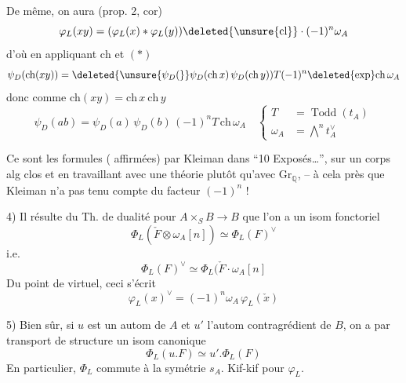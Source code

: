 De même, on aura (prop. 2, cor)
\[
\varphi_L(xy)=(\varphi_L(x)*\varphi_L(y))\deleted{\unsure{\mathrm{cl}}}\cdot(-1)^n\omega_A
\]
d'où en appliquant $\mathrm{ch}$ et $({*})$
\[
\psi_D(\mathrm{ch}(xy))=\deleted{\unsure{\psi_D(}}\psi_D(\mathrm{ch}\,x)\,\psi_D(\mathrm{ch}\,y))T(-1)^n\deleted{\exp}\mathrm{ch}\,\omega_A
\]
donc comme $\mathrm{ch}(xy)=\mathrm{ch}\,x\ \mathrm{ch}\,y$
\[
\boxed{\psi_D(ab)=\psi_D(a)\,\psi_D(b)\,(-1)^nT\,\mathrm{ch}\,\omega_A}
\quad\left\{\begin{aligned}
T&=\operatorname{Todd}(t_A)\\
\omega_A&=\bigwedge^n t_A^\vee
\end{aligned}\right.
\]

Ce sont les formules   ( affirmées) par Kleiman dans ``10 Exposés\ldots'', sur un corps alg clos et en travaillant avec une théorie  plutôt qu'avec $\mathrm{Gr}_{\mathbb Q}$, -- à cela près que Kleiman n'a pas tenu compte du facteur $(-1)^n$ !

4) Il résulte du Th. de dualité pour $A\times_S B\longrightarrow B$ que l'on a un isom fonctoriel
\[
\Phi_L(\check F\otimes\omega_A[n])\simeq\Phi_L(F)^\vee
\]
i.e.
\[
\boxed{\Phi_L(F)^\vee\simeq\Phi_L(\check F\mathbin{\cdot}\omega_A[n]}
\]
Du point de  virtuel, ceci s'écrit
\[
\varphi_L(x)^\vee=(-1)^n\omega_A\,\varphi_L(\check x)
\]

5) Bien sûr, si $u$ est un autom de $A$ et $u'$ l'autom contragrédient de $B$, on a par transport de structure un isom canonique
\[
\Phi_L(u.F)\simeq u'.\Phi_L(F)
\]
En particulier, $\Phi_L$ commute à la symétrie $s_A$. Kif-kif pour $\varphi_L$.
